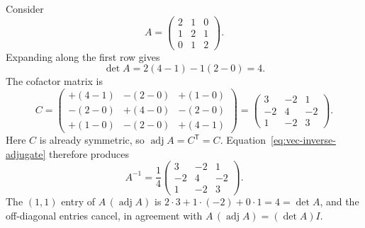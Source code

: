 \begin{example}
Consider
\begin{equation}
A=\begin{pmatrix}2&1&0\\1&2&1\\0&1&2\end{pmatrix}.
\end{equation}
Expanding along the first row gives
\begin{equation}
\det A=2(4-1)-1(2-0)=4.
\end{equation}
The cofactor matrix is
\begin{equation}
C=\begin{pmatrix}
+(4-1)&-(2-0)&+(1-0)\\
-(2-0)&+(4-0)&-(2-0)\\
+(1-0)&-(2-0)&+(4-1)
\end{pmatrix}
=\begin{pmatrix}
3&-2&1\\
-2&4&-2\\
1&-2&3
\end{pmatrix}.
\end{equation}
Here $C$ is already symmetric, so $\operatorname{adj}A=C^{\mathsf T}=C$. Equation~\eqref{eq:vec-inverse-adjugate} therefore produces
\begin{equation}
A^{-1}=\frac14\begin{pmatrix}
3&-2&1\\
-2&4&-2\\
1&-2&3
\end{pmatrix}.
\end{equation}
The $(1,1)$ entry of $A\,(\operatorname{adj}A)$ is $2\cdot3+1\cdot(-2)+0\cdot1=4=\det A$, and the off-diagonal entries cancel, in agreement with $A\,(\operatorname{adj}A)=(\det A)I$.
\end{example}
